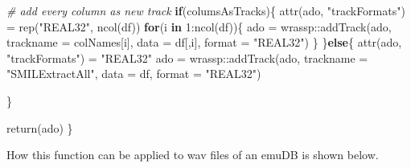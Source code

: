 \documentclass[
]{book}
\newenvironment{Shaded}{\begin{snugshade}}{\end{snugshade}}
\newcommand{\AttributeTok}[1]{\textcolor[rgb]{0.77,0.63,0.00}{#1}}
\newcommand{\CommentTok}[1]{\textcolor[rgb]{0.56,0.35,0.01}{\textit{#1}}}
\newcommand{\ControlFlowTok}[1]{\textcolor[rgb]{0.13,0.29,0.53}{\textbf{#1}}}
\newcommand{\DecValTok}[1]{\textcolor[rgb]{0.00,0.00,0.81}{#1}}
\newcommand{\FunctionTok}[1]{\textcolor[rgb]{0.00,0.00,0.00}{#1}}
\newcommand{\NormalTok}[1]{#1}
\newcommand{\OtherTok}[1]{\textcolor[rgb]{0.56,0.35,0.01}{#1}}
\newcommand{\SpecialCharTok}[1]{\textcolor[rgb]{0.00,0.00,0.00}{#1}}
\newcommand{\StringTok}[1]{\textcolor[rgb]{0.31,0.60,0.02}{#1}}
\begin{document}
\begin{Shaded}
\begin{Highlighting}[]
  \CommentTok{\# add every column as new track}
  \ControlFlowTok{if}\NormalTok{(columsAsTracks)\{}
    \FunctionTok{attr}\NormalTok{(ado, }\StringTok{"trackFormats"}\NormalTok{) }\OtherTok{=} \FunctionTok{rep}\NormalTok{(}\StringTok{"REAL32"}\NormalTok{, }\FunctionTok{ncol}\NormalTok{(df))}
    \ControlFlowTok{for}\NormalTok{(i }\ControlFlowTok{in} \DecValTok{1}\SpecialCharTok{:}\FunctionTok{ncol}\NormalTok{(df))\{}
\NormalTok{      ado }\OtherTok{=}\NormalTok{ wrassp}\SpecialCharTok{::}\FunctionTok{addTrack}\NormalTok{(ado,}
                             \AttributeTok{trackname =}\NormalTok{ colNames[i],}
                             \AttributeTok{data =}\NormalTok{ df[,i],}
                             \AttributeTok{format =} \StringTok{"REAL32"}\NormalTok{)}
\NormalTok{    \}}
\NormalTok{  \}}\ControlFlowTok{else}\NormalTok{\{}
    \FunctionTok{attr}\NormalTok{(ado, }\StringTok{"trackFormats"}\NormalTok{) }\OtherTok{=} \StringTok{"REAL32"}
\NormalTok{    ado }\OtherTok{=}\NormalTok{ wrassp}\SpecialCharTok{::}\FunctionTok{addTrack}\NormalTok{(ado,}
                           \AttributeTok{trackname =} \StringTok{"SMILExtractAll"}\NormalTok{,}
                           \AttributeTok{data =}\NormalTok{ df,}
                           \AttributeTok{format =} \StringTok{"REAL32"}\NormalTok{)}

\NormalTok{  \}}

  \FunctionTok{return}\NormalTok{(ado)}
\NormalTok{\}}
\end{Highlighting}
\end{Shaded}

How this function can be applied to wav files of an emuDB is shown below.
\end{document}
